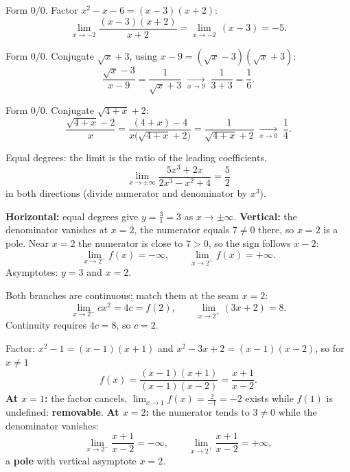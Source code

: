 \begin{solutions}
  \item Form $0/0$. Factor $x^{2}-x-6=(x-3)(x+2)$:
        \[
          \lim_{x\to -2}\frac{(x-3)(x+2)}{x+2}
          =\lim_{x\to -2}\,(x-3)=-5 .
        \]

  \item Form $0/0$. Conjugate $\sqrt{x}+3$, using
        $x-9=(\sqrt{x}-3)(\sqrt{x}+3)$:
        \[
          \frac{\sqrt{x}-3}{x-9}=\frac{1}{\sqrt{x}+3}
          \;\xrightarrow[x\to 9]{}\;
          \frac{1}{3+3}=\frac{1}{6} .
        \]

  \item Form $0/0$. Conjugate $\sqrt{4+x}+2$:
        \[
          \frac{\sqrt{4+x}-2}{x}
          =\frac{(4+x)-4}{x\bigl(\sqrt{4+x}+2\bigr)}
          =\frac{1}{\sqrt{4+x}+2}
          \;\xrightarrow[x\to 0]{}\;
          \frac{1}{4} .
        \]

  \item Equal degrees: the limit is the ratio of the leading
        coefficients,
        \[
          \lim_{x\to\pm\infty}\frac{5x^{3}+2x}{2x^{3}-x^{2}+4}
          =\frac{5}{2}
        \]
        in both directions (divide numerator and denominator by
        $x^{3}$).

  \item \textbf{Horizontal:} equal degrees give
        $y=\tfrac{3}{1}=3$ as $x\to\pm\infty$. \textbf{Vertical:} the
        denominator vanishes at $x=2$, the numerator equals $7\neq 0$
        there, so $x=2$ is a pole. Near $x=2$ the numerator is close to
        $7>0$, so the sign follows $x-2$:
        \[
          \lim_{x\to 2^{-}}f(x)=-\infty,
          \qquad
          \lim_{x\to 2^{+}}f(x)=+\infty .
        \]
        Asymptotes: $y=3$ and $x=2$.

  \item Both branches are continuous; match them at the seam $x=2$:
        \[
          \lim_{x\to 2^{-}}cx^{2}=4c=f(2),
          \qquad
          \lim_{x\to 2^{+}}(3x+2)=8 .
        \]
        Continuity requires $4c=8$, so $c=2$.

  \item Factor: $x^{2}-1=(x-1)(x+1)$ and $x^{2}-3x+2=(x-1)(x-2)$, so
        for $x\neq 1$
        \[
          f(x)=\frac{(x-1)(x+1)}{(x-1)(x-2)}=\frac{x+1}{x-2}.
        \]
        \textbf{At $x=1$:} the factor cancels,
        $\lim_{x\to 1}f(x)=\frac{2}{-1}=-2$ exists while $f(1)$ is
        undefined: \textbf{removable}. \textbf{At $x=2$:} the numerator
        tends to $3\neq 0$ while the denominator vanishes:
        \[
          \lim_{x\to 2^{-}}\frac{x+1}{x-2}=-\infty,
          \qquad
          \lim_{x\to 2^{+}}\frac{x+1}{x-2}=+\infty,
        \]
        a \textbf{pole} with vertical asymptote $x=2$.


\end{solutions}
